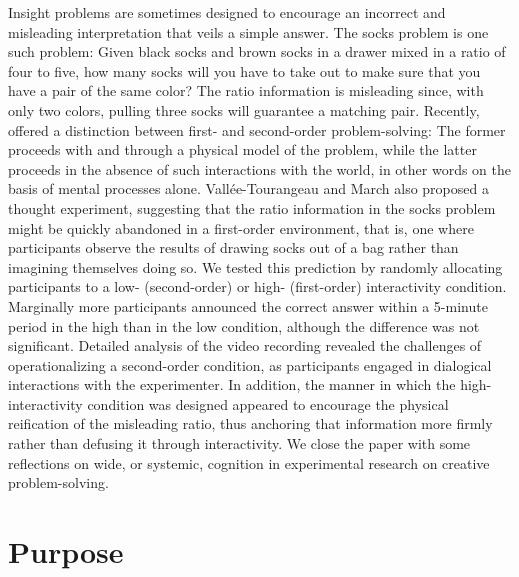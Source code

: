 Insight problems are sometimes designed to encourage an incorrect and misleading interpretation that veils a simple answer. The socks problem is one such problem: Given black socks and brown socks in a drawer mixed in a ratio of four to five, how many socks will you have to take out to make sure that you have a pair of the same color? The ratio information is misleading since, with only two colors, pulling three socks will guarantee a matching pair. Recently, \textcite{Vallée-Tourangeau2020} offered a distinction between first- and second-order problem-solving: The former proceeds with and through a physical model of the problem, while the latter proceeds in the absence of such interactions with the world, in other words on the basis of mental processes alone.
Vallée-Tourangeau and March also proposed a thought experiment, suggesting that the ratio information in the socks problem might be quickly abandoned in a first-order environment, that is, one where participants observe the results of drawing socks out of a bag rather than imagining themselves doing so. We tested this prediction by randomly allocating participants to a low- (second-order) or high- (first-order) interactivity condition. Marginally more participants announced the correct answer within a 5-minute period in the high than in the low condition, although the difference was not significant.
Detailed analysis of the video recording revealed the challenges of operationalizing a second-order condition, as participants engaged in dialogical interactions with the experimenter. In addition, the manner in which the high-interactivity condition was designed appeared to encourage the physical reification of the misleading ratio, thus anchoring that information more firmly rather than defusing it through interactivity. We close the paper with some reflections on wide, or systemic, cognition in experimental research on creative problem-solving.


\section{Purpose }


